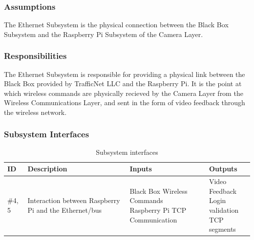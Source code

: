 \subsubsection{Assumptions}
The Ethernet Subsystem is the physical connection between the Black Box Subsystem and the Raspberry Pi Subsystem of the Camera Layer.

\subsubsection{Responsibilities}
The Ethernet Subsystem is responsible for providing a physical link between the Black Box provided by TrafficNet LLC and the Raspberry Pi. It is the point at which wireless commands are physically recieved by the Camera Layer from the Wireless Communications Layer, and sent in the form of video feedback through the wireless network.

\subsubsection{Subsystem Interfaces}

\begin {table}[H]
\caption {Subsystem interfaces} 
\begin{center}
    \begin{tabular}{ | p{1cm} | p{6cm} | p{3cm} | p{3cm} |}
    \hline
    ID & Description & Inputs & Outputs \\ \hline
    \#4, 5 & Interaction between Raspberry Pi and the Ethernet/bus & \pbox{3cm}{Black Box Wireless Commands \\ Raspberry Pi TCP Communication} & \pbox{3cm}{Video Feedback \\ Login validation \\ TCP segments}  \\ \hline
    \end{tabular}
\end{center}
\end{table}
